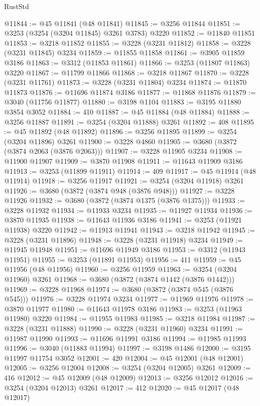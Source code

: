 \begin{lexlean}{RustStd}
\begin{coremodule}
@11844 := @45 @11841 (@48 @11841)
@11845 := @3256 @11844
@11851 := @3253 (@3254 (@3204 @11845) @3261 @3783) @3220
@11852 := @11840 @11851
@11853 := @3218 @11852
@11855 := @3228 (@3231 @11812)
@11858 := @3228 (@3231 @11845) @3234
@11859 := @11855 @11858
@11861 := @3905 @11859 @3186
@11863 := @3312 (@11853 @11861)
@11866 := @3253 (@11807 @11863) @3220
@11867 := @11799 @11866
@11868 := @3218 @11867
@11870 := @3228 (@3231 @11761)
@11873 := @3228 (@3231 @11804) @3234
@11874 := @11870 @11873
@11876 := @11696 @11874 @3186
@11877 := @11868 @11876
@11879 := @3040 (@11756 @11877)
@11880 := @3198 @1104
@11883 := @3195 @11880 @3854 @3052
@11884 := 410
@11887 := @45 @11884 (@48 @11884)
@11888 := @3256 @11887
@11891 := @3254 (@3204 @11888) @3261
@11892 := 408
@11895 := @45 @11892 (@48 @11892)
@11896 := @3256 @11895
@11899 := @3254 (@3204 @11896) @3261
@11900 := @3228 @4860
@11905 := @3680 (@3872 (@3874 @2063 (@3876 @2063)))
@11907 := @3228 @11905 @3234
@11908 := @11900 @11907
@11909 := @3870 @11908
@11911 := @11643 @11909 @3186
@11913 := @3253 (@11899 @11911)
@11914 := 409
@11917 := @45 @11914 (@48 @11914)
@11918 := @3256 @11917
@11921 := @3254 (@3204 @11918) @3261
@11926 := @3680 (@3872 (@3874 @948 (@3876 @948)))
@11927 := @3228 @11926
@11932 := @3680 (@3872 (@3874 @1375 (@3876 @1375)))
@11933 := @3228 @11932
@11934 := @11933 @3234
@11935 := @11927 @11934
@11936 := @3870 @11935
@11938 := @11643 @11936 @3186
@11941 := @3253 (@11921 @11938) @3220
@11942 := @11913 @11941
@11943 := @3218 @11942
@11945 := @3228 (@3231 @11896)
@11948 := @3228 (@3231 @11918) @3234
@11949 := @11945 @11948
@11951 := @11696 @11949 @3186
@11953 := @3312 (@11943 @11951)
@11955 := @3253 (@11891 @11953)
@11956 := 411
@11959 := @45 @11956 (@48 @11956)
@11960 := @3256 @11959
@11963 := @3254 (@3204 @11960) @3261
@11968 := @3680 (@3872 (@3874 @1442 (@3876 @1442)))
@11969 := @3228 @11968
@11974 := @3680 (@3872 (@3874 @545 (@3876 @545)))
@11976 := @3228 @11974 @3234
@11977 := @11969 @11976
@11978 := @3870 @11977
@11980 := @11643 @11978 @3186
@11983 := @3253 (@11963 @11980) @3220
@11984 := @11955 @11983
@11985 := @3218 @11984
@11987 := @3228 (@3231 @11888)
@11990 := @3228 (@3231 @11960) @3234
@11991 := @11987 @11990
@11993 := @11696 @11991 @3186
@11994 := @11985 @11993
@11996 := @3040 (@11883 @11994)
@11997 := @3198 @1486
@12000 := @3195 @11997 @11754 @3052
@12001 := 420
@12004 := @45 @12001 (@48 @12001)
@12005 := @3256 @12004
@12008 := @3254 (@3204 @12005) @3261
@12009 := 416
@12012 := @45 @12009 (@48 @12009)
@12013 := @3256 @12012
@12016 := @3254 (@3204 @12013) @3261
@12017 := 412
@12020 := @45 @12017 (@48 @12017)

\end{coremodule}
\end{lexlean}

